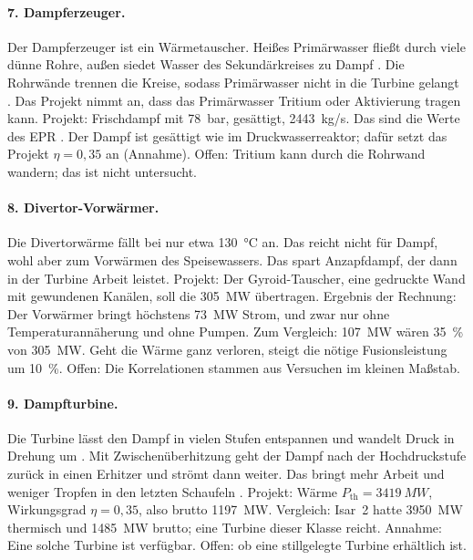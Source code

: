 \paragraph{7. Dampferzeuger.} Der Dampferzeuger ist ein Wärmetauscher. Heißes Primärwasser fließt durch viele dünne Rohre, außen siedet Wasser des Sekundärkreises zu Dampf \cite{bt_steamgen}. Die Rohrwände trennen die Kreise, sodass Primärwasser nicht in die Turbine gelangt \cite{bt_steamgen,bt_pwr}. Das Projekt nimmt an, dass das Primärwasser Tritium oder Aktivierung tragen kann. Projekt: Frischdampf mit \SI{78}{bar}, gesättigt, \SI{2443}{kg/s}. Das sind die Werte des EPR \cite{epr_en}. Der Dampf ist gesättigt wie im Druckwasserreaktor; dafür setzt das Projekt $\eta = 0{,}35$ an (Annahme). Offen: Tritium kann durch die Rohrwand wandern; das ist nicht untersucht.

\paragraph{8. Divertor-Vorwärmer.} Die Divertorwärme fällt bei nur etwa \SI{130}{\celsius} an. Das reicht nicht für Dampf, wohl aber zum Vorwärmen des Speisewassers. Das spart Anzapfdampf, der dann in der Turbine Arbeit leistet. Projekt: Der Gyroid-Tauscher, eine gedruckte Wand mit gewundenen Kanälen, soll die \SI{305}{MW} übertragen. Ergebnis der Rechnung: Der Vorwärmer bringt höchstens \SI{73}{MW} Strom, und zwar nur ohne Temperaturannäherung und ohne Pumpen. Zum Vergleich: \SI{107}{MW} wären \SI{35}{\percent} von \SI{305}{MW}. Geht die Wärme ganz verloren, steigt die nötige Fusionsleistung um \SI{10}{\percent}. Offen: Die Korrelationen stammen aus Versuchen im kleinen Maßstab.

\paragraph{9. Dampfturbine.} Die Turbine lässt den Dampf in vielen Stufen entspannen und wandelt Druck in Drehung um \cite{bt_turbine}. Mit Zwischenüberhitzung geht der Dampf nach der Hochdruckstufe zurück in einen Erhitzer und strömt dann weiter. Das bringt mehr Arbeit und weniger Tropfen in den letzten Schaufeln \cite{bt_turbine}. Projekt: Wärme $P_\text{th} = \SI{3419}{MW}$, Wirkungsgrad $\eta = 0{,}35$, also brutto \SI{1197}{MW}. Vergleich: Isar~2 hatte \SI{3950}{MW} thermisch und \SI{1485}{MW} brutto; eine Turbine dieser Klasse reicht. Annahme: Eine solche Turbine ist verfügbar. Offen: ob eine stillgelegte Turbine erhältlich ist.

